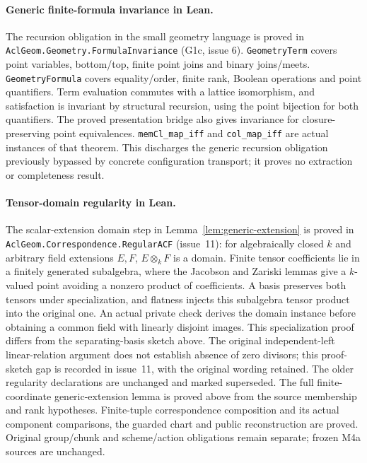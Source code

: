 \documentclass[11pt,oneside]{article}
\theoremstyle{definition}
\theoremstyle{remark}
\newcommand{\lean}[1]{\nolinkurl{#1}}
\begin{document}
\paragraph{Generic finite-formula invariance in Lean.}
The recursion obligation in the small geometry language is proved in
\lean{AclGeom.Geometry.FormulaInvariance} (G1c, issue 6).
\lean{GeometryTerm} covers point variables, bottom/top, finite point joins
and binary joins/meets.  \lean{GeometryFormula} covers equality/order, finite rank,
Boolean operations and point quantifiers.  Term evaluation commutes with a
lattice isomorphism, and satisfaction is invariant by structural recursion,
using the point bijection for both quantifiers.  The proved presentation bridge
also gives invariance for closure-preserving point equivalences.
\lean{memCl_map_iff} and \lean{col_map_iff} are actual instances of that theorem.
This discharges the generic recursion obligation previously bypassed by concrete
configuration transport; it proves no extraction or completeness result.

\clearpage
\paragraph{Tensor-domain regularity in Lean.}
The scalar-extension domain step in Lemma~\ref{lem:generic-extension}
is proved in \lean{AclGeom.Correspondence.RegularACF} (issue~11):
for algebraically closed $k$ and arbitrary field extensions $E,F$,
$E\otimes_k F$ is a domain. Finite tensor coefficients lie in a finitely generated
subalgebra, where the Jacobson and Zariski lemmas give a $k$-valued point
avoiding a nonzero product of coefficients. A basis preserves both tensors
under specialization, and flatness injects this subalgebra tensor product
into the original one. An actual private check derives the domain instance
before obtaining a common field with linearly disjoint images.
This specialization proof differs from the separating-basis sketch above.
The original independent-left linear-relation argument does not establish
absence of zero divisors; this proof-sketch gap is recorded in issue~11,
with the original wording retained.
The older regularity declarations are unchanged and marked superseded.
The full finite-coordinate generic-extension lemma is proved above from
the source membership and rank hypotheses. Finite-tuple correspondence
composition and its actual component comparisons, the guarded chart and
public reconstruction are proved. Original group/chunk and scheme/action
obligations remain separate; frozen M4a sources are unchanged.
\end{document}

